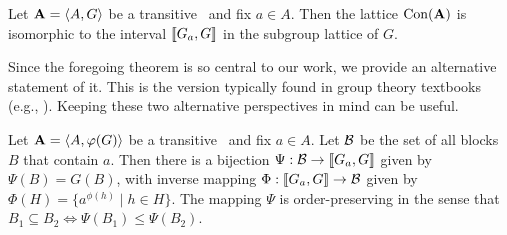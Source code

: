 \begin{theorem}
  \label{thm:g-set-isomorphism2}
  Let $\mathbf{A} = \langle A, G\rangle$ be a transitive \Gset\ and fix $a\in A$.  
  Then the lattice $\operatorname{Con}(\mathbf{A})$ is isomorphic to the
  interval $\llbracket G_a, G\rrbracket$ in the subgroup lattice of $G$.
\end{theorem}

Since the foregoing theorem is so central to our work, we provide an alternative 
statement of it. This is the version typically found in group theory 
textbooks (e.g., \cite{Dixon:1996}).  Keeping these two alternative perspectives in
mind can be useful.

\begin{theorem}
  Let $\mathbf{A} = \langle A, \varphi(G)\rangle$ be a transitive \Gset\
  and fix $a \in A$. Let $\mathcal{B}$ be the set of all blocks $B$ that contain $a$.
  Then there is a bijection $\Psi :\mathcal{B} \rightarrow \llbracket G_{a},G\rrbracket$ given by $\Psi(B)= G(B)$,
  with inverse mapping $\Phi: \llbracket G_{a},G\rrbracket \rightarrow \mathcal{B} $ 
  given by $\Phi(H) = \{a^{\phi(h)}  \mid  h\in H\}$. 
  The mapping $\Psi$ is order-preserving in the sense
  that
  $B_1\subseteq B_2 \Leftrightarrow \Psi(B_1) \leq \Psi(B_2)$.
\end{theorem}

